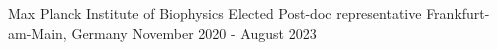 \def \cvvertspace {2.00mm}
\newpage
{}

\begin{cventries}
  \cventry
    {Max Planck Institute of Biophysics}
    {Elected Post-doc representative}
    {Frankfurt-am-Main, Germany}
    {November 2020 - August 2023}
    {}

\end{cventries}
